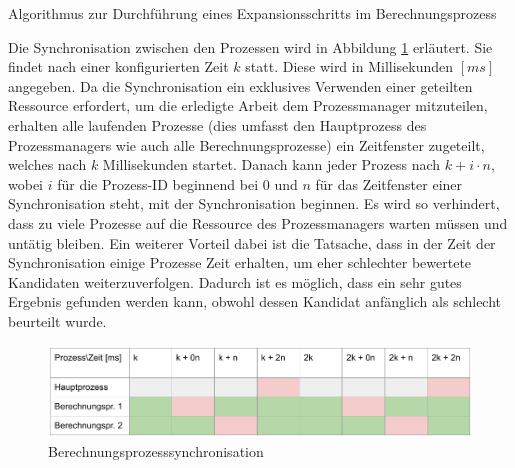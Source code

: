 \begin{algorithm}[H]
    \DontPrintSemicolon
    \caption{Algorithmus zur Durchführung eines Expansionsschritts im Berechnungsprozess}
    \label{alg:expand_berechnung}
\end{algorithm}

Die Synchronisation zwischen den Prozessen wird in Abbildung \ref{fig:berechnungsprozess_synchronisation} erläutert.
Sie findet nach einer konfigurierten Zeit $k$ statt. Diese wird in Millisekunden $[ms]$
angegeben. Da die Synchronisation ein exklusives Verwenden einer geteilten Ressource erfordert, um die erledigte Arbeit
dem Prozessmanager mitzuteilen, erhalten alle laufenden Prozesse (dies umfasst den Hauptprozess des Prozessmanagers wie auch
alle Berechnungsprozesse) ein Zeitfenster zugeteilt, welches nach $k$ Millisekunden startet. Danach kann jeder Prozess nach
$k + i \cdot n$, wobei $i$ für die Prozess-ID beginnend bei $0$ und $n$ für das Zeitfenster einer Synchronisation steht,
mit der Synchronisation beginnen. Es wird so verhindert, dass zu viele Prozesse auf die Ressource des Prozessmanagers
warten müssen und untätig bleiben. Ein weiterer Vorteil dabei ist die Tatsache, dass in der Zeit der Synchronisation
einige Prozesse Zeit erhalten, um eher schlechter bewertete Kandidaten weiterzuverfolgen. Dadurch ist es möglich,
dass ein sehr gutes Ergebnis gefunden werden kann, obwohl dessen Kandidat anfänglich als schlecht beurteilt wurde.

\begin{figure}[h!]
    \begin{center}
        \includegraphics[width=0.8\linewidth]{../common/03_billiard_ai/resources/15_berechnungsprozess_synchronisation.png}
    \end{center}
    \caption{Berechnungsprozesssynchronisation}
    \label{fig:berechnungsprozess_synchronisation}
\end{figure}

